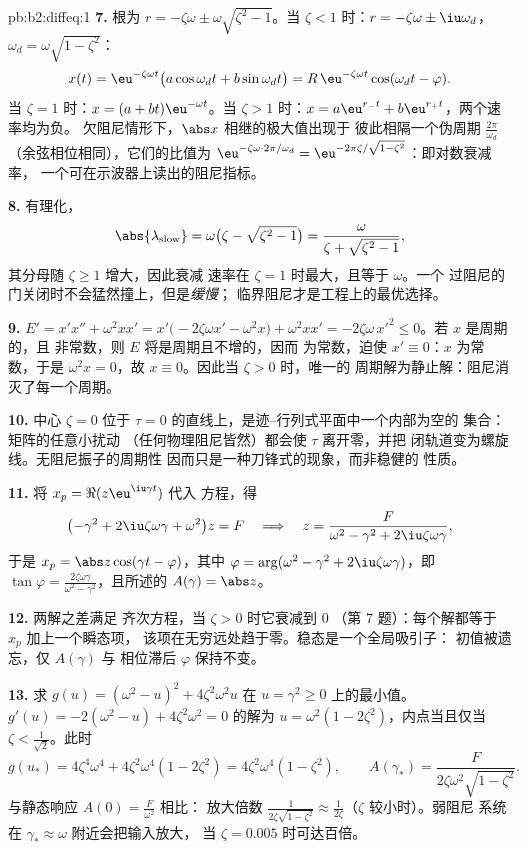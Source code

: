 \begin{solution}{pb:b2:diffeq:1}
\textbf{7.} 根为 $r = -\zeta\omega \pm
\omega\sqrt{\zeta^2-1}$。当 $\zeta < 1$ 时：$r = -\zeta\omega
\pm \iu\omega_d$，$\omega_d = \omega\sqrt{1-\zeta^2}$：
\[
x(t) = \eu^{-\zeta\omega t}\bigl(a\cos\omega_dt +
b\sin\omega_dt\bigr)
= R\,\eu^{-\zeta\omega t}\cos(\omega_dt - \varphi) .
\]
当 $\zeta = 1$ 时：$x = (a + bt)\eu^{-\omega t}$。当 $\zeta >
1$ 时：$x = a\eu^{r_-t} + b\eu^{r_+t}$，两个速率均为负。
欠阻尼情形下，$\abs x$ 相继的极大值出现于
彼此相隔一个伪周期 $\frac{2\pi}{\omega_d}$
（余弦相位相同），它们的比值为
$\eu^{-\zeta\omega\cdot2\pi/\omega_d} =
\eu^{-2\pi\zeta/\sqrt{1-\zeta^2}}$：即对数衰减率，
一个可在示波器上读出的阻尼指标。

\textbf{8.} 有理化，
\[
\abs{\lambda_{\mathrm{slow}}} = \omega\bigl(\zeta -
\sqrt{\zeta^2-1}\bigr)
= \frac{\omega}{\zeta + \sqrt{\zeta^2 - 1}} ,
\]
其分母随 $\zeta \geq 1$ 增大，因此衰减
速率在 $\zeta = 1$ 时最大，且等于 $\omega$。一个
过阻尼的门关闭时不会猛然撞上，但是\emph{缓慢}；
临界阻尼才是工程上的最优选择。

\textbf{9.} $E' = x'x'' + \omega^2xx' =
x'\bigl(-2\zeta\omega x' - \omega^2x\bigr) + \omega^2xx' =
-2\zeta\omega\,x'^2 \leq 0$。若 $x$ 是周期的，且
非常数，则 $E$ 将是周期且不增的，因而
为常数，迫使 $x' \equiv 0$：$x$ 为常数，于是
$\omega^2x = 0$，故 $x \equiv 0$。因此当 $\zeta > 0$ 时，唯一的
周期解为静止解：阻尼消灭了每一个周期。

\textbf{10.} 中心 $\zeta = 0$ 位于 $\tau =
0$ 的直线上，是迹–行列式平面中一个内部为空的
集合：矩阵的任意小扰动
（任何物理阻尼皆然）都会使 $\tau$ 离开零，并把
闭轨道变为螺旋线。无阻尼振子的周期性
因而只是一种刀锋式的现象，而非稳健的
性质。

\textbf{11.} 将 $x_p = \Re(z\eu^{\iu\gamma t})$ 代入
方程，得
\[
\bigl(-\gamma^2 + 2\iu\zeta\omega\gamma +
\omega^2\bigr)z = F
\quad\Longrightarrow\quad
z = \frac{F}{\omega^2 - \gamma^2 + 2\iu\zeta\omega\gamma},
\]
于是 $x_p = \abs z\cos(\gamma t - \varphi)$，其中 $\varphi =
\arg(\omega^2 - \gamma^2 + 2\iu\zeta\omega\gamma)$，即\
$\tan\varphi = \frac{2\zeta\omega\gamma}{\omega^2 -
\gamma^2}$，且所述的 $A(\gamma) = \abs z$。

\textbf{12.} 两解之差满足
齐次方程，当 $\zeta > 0$ 时它衰减到 $0$
（第 7 题）：每个解都等于 $x_p$ 加上一个瞬态项，
该项在无穷远处趋于零。稳态是一个全局吸引子：
初值被遗忘，仅 $A(\gamma)$ 与
相位滞后 $\varphi$ 保持不变。

\textbf{13.} 求 $g(u) = (\omega^2 - u)^2 +
4\zeta^2\omega^2u$ 在 $u = \gamma^2 \geq 0$ 上的最小值。$g'(u) =
-2(\omega^2 - u) + 4\zeta^2\omega^2 = 0$ 的解为 $u = \omega^2(1 -
2\zeta^2)$，内点当且仅当 $\zeta < \frac{1}{\sqrt2}$。此时
\[
g(u_*) = 4\zeta^4\omega^4 + 4\zeta^2\omega^4(1 - 2\zeta^2)
= 4\zeta^2\omega^4(1 - \zeta^2),
\qquad
A(\gamma_*) = \frac{F}{2\zeta\omega^2\sqrt{1 - \zeta^2}} .
\]
与静态响应 $A(0) = \frac{F}{\omega^2}$ 相比：
放大倍数 $\frac{1}{2\zeta\sqrt{1-\zeta^2}} \approx
\frac{1}{2\zeta}$（$\zeta$ 较小时）。弱阻尼
系统在 $\gamma_* \approx \omega$ 附近会把输入放大，
当 $\zeta = 0.005$ 时可达百倍。


\end{solution}
